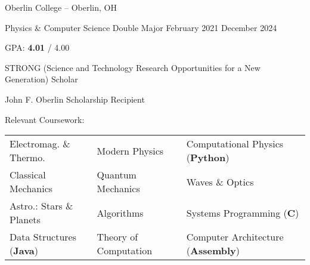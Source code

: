 \begin{entry}{Oberlin College -- Oberlin, OH}

	\entryItem
		{Physics \& Computer Science Double Major}
		{February 2021}
		{December 2024}

	\begin{items}
		\item GPA: \textbf{4.01} / 4.00
		
		\item STRONG (Science and Technology Research Opportunities for a New Generation) Scholar

		\item John F. Oberlin Scholarship Recipient
		
		\item Relevant Coursework:
		
			\begin{tabular}{lll}
				Electromag. \& Thermo. & Modern Physics & Computational Physics (\textbf{Python}) \\
				Classical Mechanics & Quantum Mechanics & Waves \& Optics \\
				Astro.: Stars \& Planets & Algorithms & Systems Programming (\textbf{C}) \\
				Data Structures (\textbf{Java}) & Theory of Computation & Computer Architecture (\textbf{Assembly}) \\
			\end{tabular}
	\end{items}

\end{entry}
